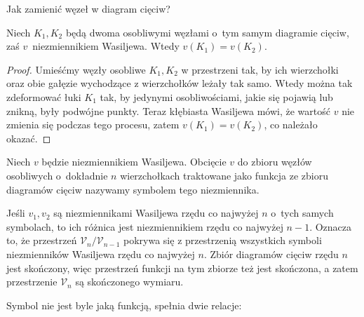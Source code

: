 \begin{tobedone}
    Jak zamienić węzeł w diagram cięciw?
\end{tobedone}

\begin{proposition}
    Niech $K_1, K_2$ będą dwoma osobliwymi węzłami o~tym samym diagramie cięciw, zaś $v$~niezmiennikiem Wasiljewa.
    Wtedy $v(K_1) = v(K_2)$.
\end{proposition}

\begin{proof}
    Umieśćmy węzły osobliwe $K_1, K_2$ w przestrzeni tak, by ich wierzchołki oraz obie gałęzie wychodzące z wierzchołków leżały tak samo. Wtedy można tak zdeformować łuki $K_1$ tak, by jedynymi osobliwościami, jakie się pojawią lub znikną, były podwójne punkty.
    Teraz kłębiasta Wasiljewa mówi, że wartość $v$ nie zmienia się podczas tego procesu, zatem $v(K_1) = v(K_2)$, co należało okazać.
\end{proof}

\begin{definition}
    Niech $v$ będzie niezmiennikiem Wasiljewa.
    Obcięcie $v$ do zbioru węzłów osobliwych o~dokładnie $n$ wierzchołkach traktowane jako funkcja ze zbioru diagramów cięciw nazywamy symbolem tego niezmiennika.
\end{definition}

Jeśli $v_1, v_2$ są niezmiennikami Wasiljewa rzędu co najwyżej $n$ o~tych samych symbolach, to ich różnica jest niezmiennikiem rzędu co najwyżej $n - 1$.
Oznacza to, że przestrzeń $\mathcal V_n/\mathcal V_{n-1}$ pokrywa się z przestrzenią wszystkich symboli niezmienników Wasiljewa rzędu co najwyżej $n$.
Zbiór diagramów cięciw rzędu $n$ jest skończony, więc przestrzeń funkcji na tym zbiorze też jest skończona, a zatem przestrzenie $\mathcal V_n$ są skończonego wymiaru.

Symbol nie jest byle jaką funkcją, spełnia dwie relacje:

